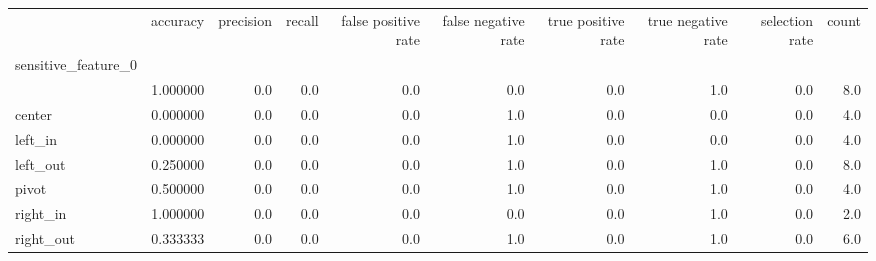 \begin{tabular}{lrrrrrrrrr}
\toprule
{} &  accuracy &  precision &  recall &  false positive rate &  false negative rate &  true positive rate &  true negative rate &  selection rate &  count \\
sensitive\_feature\_0 &           &            &         &                      &                      &                     &                     &                 &        \\
\midrule
                    &  1.000000 &        0.0 &     0.0 &                  0.0 &                  0.0 &                 0.0 &                 1.0 &             0.0 &    8.0 \\
center              &  0.000000 &        0.0 &     0.0 &                  0.0 &                  1.0 &                 0.0 &                 0.0 &             0.0 &    4.0 \\
left\_in             &  0.000000 &        0.0 &     0.0 &                  0.0 &                  1.0 &                 0.0 &                 0.0 &             0.0 &    4.0 \\
left\_out            &  0.250000 &        0.0 &     0.0 &                  0.0 &                  1.0 &                 0.0 &                 1.0 &             0.0 &    8.0 \\
pivot               &  0.500000 &        0.0 &     0.0 &                  0.0 &                  1.0 &                 0.0 &                 1.0 &             0.0 &    4.0 \\
right\_in            &  1.000000 &        0.0 &     0.0 &                  0.0 &                  0.0 &                 0.0 &                 1.0 &             0.0 &    2.0 \\
right\_out           &  0.333333 &        0.0 &     0.0 &                  0.0 &                  1.0 &                 0.0 &                 1.0 &             0.0 &    6.0 \\
\bottomrule
\end{tabular}
